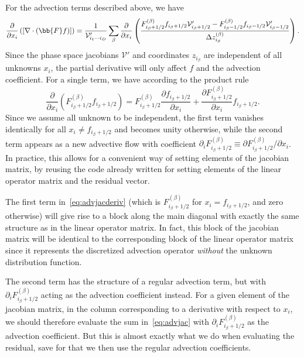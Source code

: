 \documentclass{notes}
\newcommand{\Vp}{\mathcal{V}'}
\begin{document}
    For the advection terms described above, we have
    \begin{equation}\label{eq:advjac}
        \frac{\partial}{\partial x_i}\left( \left[ \nabla\cdot\left(\bb{F} f\right) \right] \right) =
        \frac{1}{\Vp_{i_1\cdots i_D}}\sum_\beta \frac{\partial}{\partial x_i}\left(\frac{
            F^{(\beta)}_{i_\beta+1/2}f_{i_\beta+1/2} \Vp_{i_\beta+1/2} -
            F^{(\beta)}_{i_\beta-1/2}f_{i_\beta-1/2} \Vp_{i_\beta-1/2}
        }{\Delta z^{(\beta)}_{i_\beta}}\right).
    \end{equation}
    Since the phase space jacobians $\Vp$ and coordinates $z_{i_\beta}$ are
    independent of all unknowns $x_i$, the partial derivative will only affect
    $f$ and the advection coefficient. For a single term, we have according to
    the product rule
    \begin{equation}\label{eq:advjacderiv}
        \frac{\partial}{\partial x_i}\left( F^{(\beta)}_{i_\beta+1/2} f_{i_\beta+1/2} \right) =
        F^{(\beta)}_{i_\beta+1/2}\frac{\partial f_{i_\beta+1/2}}{\partial x_i} +
        \frac{\partial F^{(\beta)}_{i_\beta+1/2}}{\partial x_i} f_{i_\beta+1/2}.
    \end{equation}
    Since we assume all unknown to be independent, the first term vanishes
    identically for all $x_i\neq f_{i_\beta+1/2}$ and becomes unity otherwise,
    while the second term appears as a new advective flow with coefficient
    $\partial_i F^{(\beta)}_{i_\beta+1/2}\equiv \partial F^{(\beta)}_{i_\beta+1/2}/\partial x_i$.
    In practice, this allows for a convenient way of setting elements of the
    jacobian matrix, by reusing the code already written for setting elements of
    the linear operator matrix and the residual vector.

    The first term in~\eqref{eq:advjacderiv} (which is $F^{(\beta)}_{i_\beta+1/2}$
    for $x_i=f_{i_\beta+1/2}$, and zero otherwise) will give rise to a block
    along the main diagonal with exactly the same structure as in the linear
    operator matrix. In fact, this block of the jacobian matrix will be
    identical to the corresponding block of the linear operator matrix since
    it represents the discretized advection operator {\em without} the unknown
    distribution function.

    The second term has the structure of a regular advection term, but with
    $\partial_i F^{(\beta)}_{i_\beta+1/2}$ acting as the advection coefficient
    instead. For a given element of the jacobian matrix, in the column
    corresponding to a derivative with respect to $x_i$, we should therefore
    evaluate the sum in~\eqref{eq:advjac} with $\partial_i F^{(\beta)}_{i_\beta+1/2}$
    as the advection coefficient. But this is almost exactly what we do when
    evaluating the residual, save for that we then use the regular advection
    coefficients.
\end{document}
